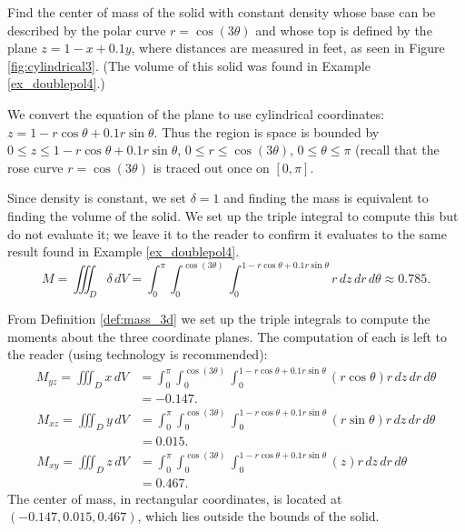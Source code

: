 {Find the center of mass of the solid with constant density whose base can be described by the polar curve $r=\cos(3\theta)$ and whose top is defined by the plane $z=1-x+0.1y$, where distances are measured in feet, as seen in Figure \ref{fig:cylindrical3}. (The volume of this solid was found in Example \ref{ex_doublepol4}.)
}
{We convert the equation of the plane to use cylindrical coordinates: $z= 1-r\cos\theta+0.1r\sin\theta$. Thus the region is space is bounded by $0 \leq z \leq 1-r\cos\theta + 0.1r\sin\theta$, $0 \leq r \leq \cos(3\theta)$, $0 \leq \theta \leq \pi$ (recall that the rose curve $r=\cos(3\theta)$ is traced out once on $[0,\pi]$.

Since density is constant, we set $\delta = 1$ and finding the mass is equivalent to finding the volume of the solid. We set up the triple integral to compute this but do not evaluate it; we leave it to the reader to confirm it evaluates to the same result found in Example \ref{ex_doublepol4}.
\[
M = \iiint_D\delta \, dV = \int_0^{\pi}\int_0^{\cos(3\theta)}\int_0^{1-r\cos\theta+0.1r\sin\theta} r\,dz\,dr\,d\theta \approx 0.785.
\]

From Definition \ref{def:mass_3d} we set up the triple integrals to compute the moments about the three coordinate planes. The computation of each is left to the reader (using technology is recommended):
\begin{align*}
M_{yz} = \iiint_D x\,dV &= \int_0^{\pi}\int_0^{\cos(3\theta)}\int_0^{1-r\cos\theta+0.1r\sin\theta} (r\cos\theta) r\,dz\,dr\,d\theta\\
&= -0.147.
\end{align*}
\begin{align*}
M_{xz} = \iiint_D y\,dV &= \int_0^{\pi}\int_0^{\cos(3\theta)}\int_0^{1-r\cos\theta+0.1r\sin\theta} (r\sin\theta) r\,dz\,dr\,d\theta\\
&= 0.015.\\
M_{xy} = \iiint_D z\,dV &= \int_0^{\pi}\int_0^{\cos(3\theta)}\int_0^{1-r\cos\theta+0.1r\sin\theta} (z) r\,dz\,dr\,d\theta\\
 &= 0.467.
\end{align*}
The center of mass, in rectangular coordinates,  is located at $(-0.147,0.015,0.467)$, which lies outside the bounds of the solid.
}\pagebreak

